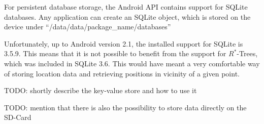 For persistent database storage, the Android API contains
support for SQLite databases. Any application can create
an SQLite object, which is stored on the device under
``/data/data/package\_name/databases''

Unfortunately, up to Android version 2.1, the installed
support for SQLite is 3.5.9. This means that it is not
possible to benefit from the support for $R^*$-Trees,
which was included in SQLite 3.6. This would have meant
a very comfortable way of storing location data and
retrieving positions in vicinity of a given point.

TODO: shortly describe the key-value store and how to use it

TODO: mention that there is also the possibility to store data directly on the SD-Card

